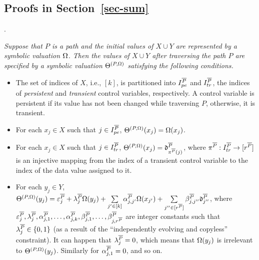 \begin{appendix}
\section{Proofs in Section~\ref{sec-sum}}


.
{\it Suppose that $P$ is a path and the initial values of $X \cup Y$ are represented by a symbolic valuation $\Omega$. Then the values of $X \cup Y$ after traversing the path $P$ are specified by a symbolic valuation $\Theta^{(P,\Omega)}$ satisfying the following conditions.
\begin{itemize}
\item The set of indices of $X$, i.e., $[k]$, is partitioned into $I^{\overline{P}}_{pe}$ and $I^{\overline{P}}_{tr}$, the indices of \emph{persistent} and \emph{transient} control variables, respectively. A control variable is persistent if its value has not been changed while traversing $P$, otherwise, it is transient.
\item For each $x_j\in X$ such that $j\in I^{\overline{P}}_{pe}$, $\Theta^{(P,\Omega)}(x_j)=\Omega(x_j)$.
%
\item  For each $x_j\in X$ such that $j\in I^{\overline{P}}_{tr}$,
$\Theta^{(P,\Omega)}(x_j)=\mathfrak{d}^{\overline{P}}_{\pi^{\overline{P}}(j)}$, where $\pi^{\overline{P}}: I^{\overline{P}}_{tr} \rightarrow [r^{\overline{P}}]$ is an injective mapping from the index of a transient control variable to the index of the data value assigned to it.
% 
\item For each $y_j \in Y$, 
$
 \Theta^{(P,\Omega)}(y_j)  =
 \varepsilon^{\overline{P}}_{j} + 
 \lambda^{\overline{P}}_j \Omega(y_j)  + 
  \sum\limits_{j'\in [k]}\alpha^{\overline{P}}_{j,j'}\Omega(x_{j'}) +
  \sum\limits_{j''\in [r^{\overline{P}}]}\beta^{\overline{P}}_{j,j''} \mathfrak{d}^{\overline{P}}_{j''}$,
where $\varepsilon^{\overline{P}}_j,\lambda^{\overline{P}}_j, \alpha^{\overline{P}}_{j,1},\dots,\alpha^{\overline{P}}_{j,k}, \beta^{\overline{P}}_{j,1},\dots,\beta^{\overline{P}}_{j,r^{\overline{P}}}$ are integer constants such that $\lambda^{\overline{P}}_{j} \in \{0,1\}$ (as a result of the ``independently evolving and copyless'' constraint).  It can happen that $\lambda^{\overline{P}}_j =0$,  which means that $\Omega(y_j)$ is irrelevant to $\Theta^{(P,\Omega)}(y_j)$. Similarly for $\alpha^{\overline{P}}_{j,1}=0$, and so on.
\end{itemize}
}


\end{appendix}
